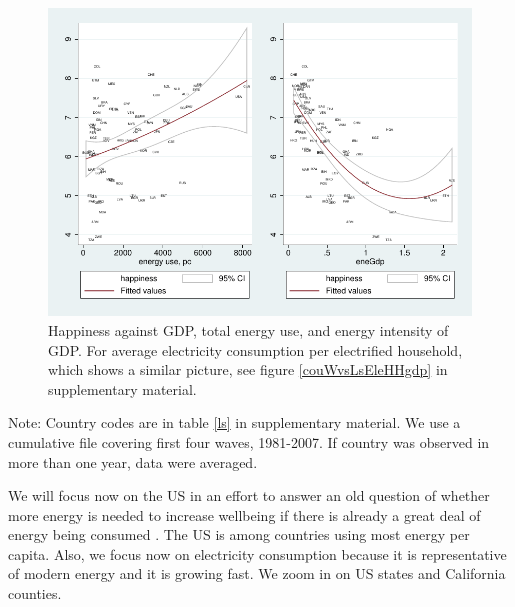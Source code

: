 \documentclass[10pt, letterpaper]{article}
\begin{document}
\begin{spacing}{1.4}
\begin{figure}[H]
 \includegraphics[width=6in]{graphsAndTables/couWvsLsEnePerGdp2.pdf}\centering
 \caption{Happiness against GDP, total energy use, and energy intensity of GDP. For average electricity consumption per electrified
   household, which shows a similar picture, see figure \ref{couWvsLsEleHHgdp}
   in supplementary material.}\label{couWvsLsEnePerGdp2} %
\end{figure}
\vspace{-.2in}
{\footnotesize\noindent Note: Country codes are in table \ref{ls} in supplementary
  material. We use a cumulative file
covering first four waves, 1981-2007. If country was observed in more than one year, data were averaged.}
\vspace{.2in}

We will focus now on the US in an effort to answer
an old question of whether more energy is needed to increase wellbeing if there
is already a great deal of energy being consumed \cite{mazur74}. The US is among
countries using most energy per capita.
Also, we focus
now on electricity consumption because it is representative of modern
energy %
and it is growing fast. %
%
 We zoom in on US states and California counties.


\end{spacing}
\end{document}
